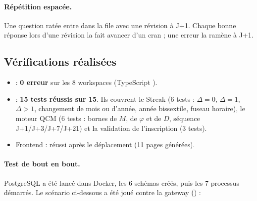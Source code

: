 \paragraph{Répétition espacée.} Une question ratée entre dans la file avec une révision à J+1. Chaque bonne réponse lors d'une révision la fait avancer d'un cran ; une erreur la ramène à J+1.
\begin{center}
\end{center}

\subsection{Vérifications réalisées}

\begin{ok}
\begin{itemize}
  \item {} : \textbf{0 erreur} sur les 8 workspaces (TypeScript ).
  \item {} : \textbf{15 tests réussis sur 15}. Ils couvrent le Streak (6 tests : $\Delta=0$, $\Delta=1$, $\Delta>1$, changement de mois ou d'année, année bissextile, fuseau horaire), le moteur QCM (6 tests : bornes de $M$, de $\varphi$ et de $D$, séquence J+1/J+3/J+7/J+21) et la validation de l'inscription (3 tests).
  \item Frontend :  réussi après le déplacement (11 pages générées).
\end{itemize}
\end{ok}

\paragraph{Test de bout en bout.} PostgreSQL a été lancé dans Docker, les 6 schémas créés, puis les 7 processus démarrés. Le scénario ci-dessous a été joué contre la gateway () :

